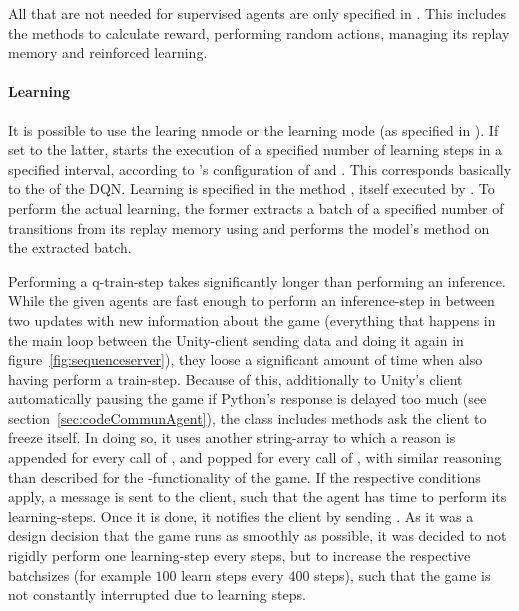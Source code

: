 All  that are not needed for supervised agents are only specified in . This includes the methods to calculate reward, performing random actions, managing its replay memory and reinforced learning.


\paragraph{Learning}

It is possible to use the  learing nmode or the  learning mode (as specified in ). If set to the latter,  starts the execution of a specified number of learning steps in a specified interval, according to 's configuration of  and . This corresponds basically to the  of the DQN\cite{mnih_human-level_2015}. Learning is specified in the method , itself executed by . To perform the actual learning, the former extracts a batch of a specified number of transitions from its replay memory using  and performs the model's method  on the extracted batch. 

Performing a q-train-step takes significantly longer than performing an inference. While the given agents are fast enough to perform an inference-step in between two updates with new information about the game (everything that happens in the main loop between the Unity-client sending data and doing it again in figure~\ref{fig:sequenceserver}), they loose a significant amount of time when also having perform a train-step. Because of this, additionally to Unity's client automatically pausing the game if Python's response is delayed too much (see section~\ref{sec:codeCommunAgent}), the class  includes methods ask the client to freeze itself. In doing so, it uses another string-array  to which a reason is appended for every call of , and popped for every call of , with similar reasoning than described for the -functionality of the game. If the respective conditions apply, a message  is sent to the client, such that the agent has time to perform its learning-steps. Once it is done, it notifies the client by sending . As it was a design decision that the game runs as smoothly as possible, it was decided to not rigidly perform one learning-step every 
 steps, but to increase the respective batchsizes (for example $100$ learn steps every $400$ steps), such that the game is not constantly interrupted due to learning steps. 

